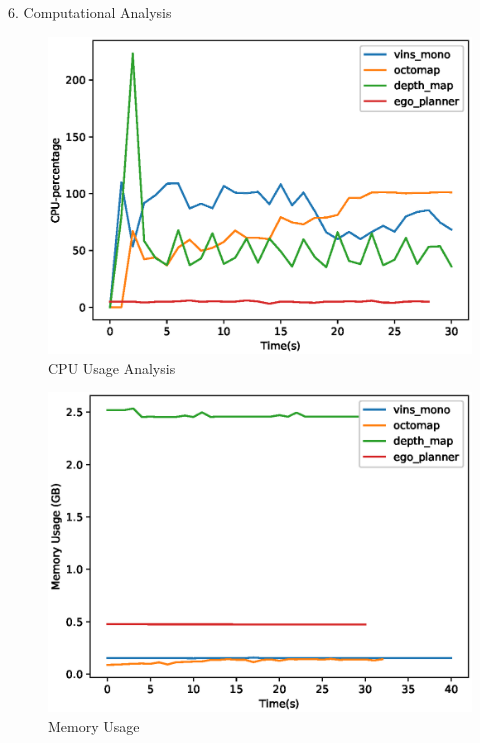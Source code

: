 \documentclass[10pt]{beamer}
\begin{document}
\begin{frame}{}
    \begin{description}
        \item[6. Computational Analysis]
    \end{description}
    \begin{minipage}{0.47\textwidth}

        \begin{figure}[h!]
            \centering
            \includegraphics[scale=0.40]{computation.eps}
            \caption{CPU Usage Analysis}
        \end{figure}
    \end{minipage}
    \begin{minipage}{0.47\textwidth}

        \begin{figure}[h!]
            \centering
            \includegraphics[scale=0.40]{memory.eps}
            \caption{Memory Usage}
        \end{figure}
    \end{minipage}


\end{frame}
\end{document}
